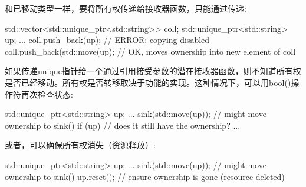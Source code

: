 和已移动类型一样，要将所有权传递给接收器函数，只能通过传递:

\begin{cppcode}
std::vector<std::unique_ptr<std::string>> coll;
std::unique_ptr<std::string> up;
...
coll.push_back(up); // ERROR: copying disabled
coll.push_back(std::move(up); // OK, moves ownership into new element of coll
\end{cppcode}

如果传递unique指针给一个通过引用接受参数的潜在接收器函数，则不知道所有权是否已经移动。所有权是否转移取决于功能的实现。这种情况下，可以用bool()操作符再次检查状态:

\begin{cppcode}
std::unique_ptr<std::string> up;
...
sink(std::move(up)); // might move ownership to sink()
if (up) { // does it still have the ownership?
	...
}
\end{cppcode}

或者，可以确保所有权消失（资源释放）:

\begin{cppcode}
std::unique_ptr<std::string> up;
...
sink(std::move(up)); // might move ownership to sink()
up.reset(); // ensure ownership is gone (resource deleted)
\end{cppcode}














